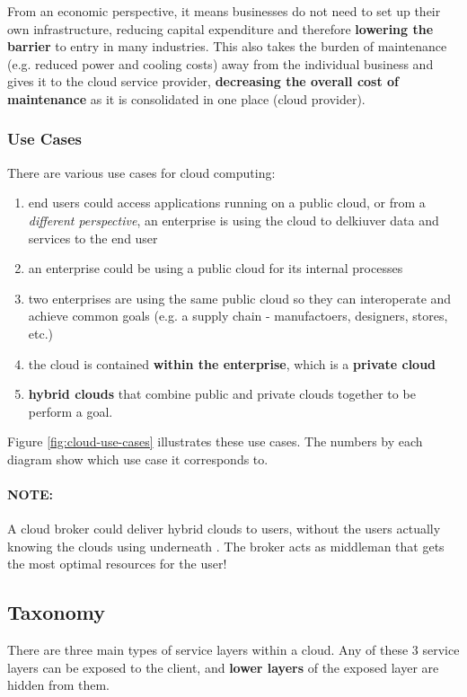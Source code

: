 \documentclass{article}
\begin{document}
From an economic perspective, it means businesses do not need to set up their own infrastructure, reducing capital expenditure and therefore \textbf{lowering the barrier} to entry in many industries. This also takes the burden of maintenance (e.g. reduced power and cooling costs) away from the individual business and gives it to the cloud service provider, \textbf{decreasing the overall cost of maintenance} as it is consolidated in one place (cloud provider).

\subsubsection{Use Cases}

There are various use cases for cloud computing:
\begin{enumerate}
	\item end users could access applications running on a public cloud, or from a \textit{different perspective}, an enterprise is using the cloud to delkiuver data and services to the end user
	\item an enterprise could be using a public cloud for its internal processes
	\item two enterprises are using the same public cloud so they can interoperate and achieve common goals (e.g. a supply chain - manufactoers, designers, stores, etc.)
	\item the cloud is contained \textbf{within the enterprise}, which is a \textbf{private cloud}
	\item \textbf{hybrid clouds} that combine public and private clouds together to be perform a goal. 
\end{enumerate}
Figure \ref{fig:cloud-use-cases} illustrates these use cases. The numbers by each diagram show which use case it corresponds to.

\paragraph{\textbf{NOTE: }} A cloud broker could deliver hybrid clouds to users, without the users actually knowing the clouds using underneath . The broker acts as middleman that gets the most optimal resources for the user!

\subsection{Taxonomy}

There are three main types of service layers within a cloud. Any of these 3 service layers can be exposed to the client, and \textbf{lower layers} of the exposed layer are hidden from them.
\end{document}
